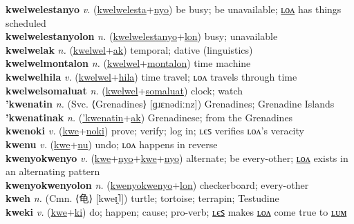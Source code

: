 \textbf{kwelwelestanyo} \textit{v.} (\hyperref[kwelwelesta]{kwelwelesta}+\hyperref[nyo]{nyo})
be busy; be unavailable; \hyperref[kwelwelestanyolon]{ʟᴏᴧ} has things scheduled \label{kwelwelestanyo} \\
\textbf{kwelwelestanyolon} \textit{n.} (\hyperref[kwelwelestanyo]{kwelwelestanyo}+\hyperref[lon]{lon})
busy; unavailable \label{kwelwelestanyolon} \\
\textbf{kwelwelak} \textit{n.} (\hyperref[kwelwel]{kwelwel}+\hyperref[ak]{ak})
temporal; dative (linguistics) \label{kwelwelak} \\
\textbf{kwelwelmontalon} \textit{n.} (\hyperref[kwelwel]{kwelwel}+\hyperref[montalon]{montalon})
time machine \label{kwelwelmontalon} \\
\textbf{kwelwelhila} \textit{v.} (\hyperref[kwelwel]{kwelwel}+\hyperref[hila]{hila})
time travel; ʟᴏᴧ travels through time \label{kwelwelhila} \\
\textbf{kwelwelsomaluat} \textit{n.} (\hyperref[kwelwel]{kwelwel}+\hyperref[somaluat]{somaluat})
clock; watch \label{kwelwelsomaluat} \\
\textbf{'kwenatin} \textit{n.} (Svc. ⟨Grenadines⟩ [ɡɹɛnədiːnz])
Grenadines; Grenadine Islands \label{'kwenatin} \\
\textbf{'kwenatinak} \textit{n.} (\hyperref['kwenatin]{'kwenatin}+\hyperref[ak]{ak})
Grenadinese; from the Grenadines \label{'kwenatinak} \\
\textbf{kwenoki} \textit{v.} (\hyperref[kwe]{kwe}+\hyperref[noki]{noki})
prove; verify; log in; ʟєꜱ verifies ʟᴏᴧ’s veracity \label{kwenoki} \\
\textbf{kwenu} \textit{v.} (\hyperref[kwe]{kwe}+\hyperref[nu]{nu})
undo; ʟᴏᴧ happens in reverse \label{kwenu} \\
\textbf{kwenyokwenyo} \textit{v.} (\hyperref[kwe]{kwe}+\hyperref[nyo]{nyo}+\hyperref[kwe]{kwe}+\hyperref[nyo]{nyo})
alternate; be every-other; \hyperref[kwenyokwenyolon]{ʟᴏᴧ} exists in an alternating pattern \label{kwenyokwenyo} \\
\textbf{kwenyokwenyolon} \textit{n.} (\hyperref[kwenyokwenyo]{kwenyokwenyo}+\hyperref[lon]{lon})
checkerboard; every-other \label{kwenyokwenyolon} \\
\textbf{kweh} \textit{n.} (Cmn. ⟨龟⟩ [kweɪ̯˥])
turtle; tortoise; terrapin; Testudine \label{kweh} \\
\textbf{kweki} \textit{v.} (\hyperref[kwe]{kwe}+\hyperref[ki]{ki})
do; happen; cause; pro-verb; \hyperref[kwekiles]{ʟєꜱ} makes \hyperref[kwekilon]{ʟᴏᴧ} come true to \hyperref[kwekilum]{ʟᴜᴍ} \label{kweki} \\
